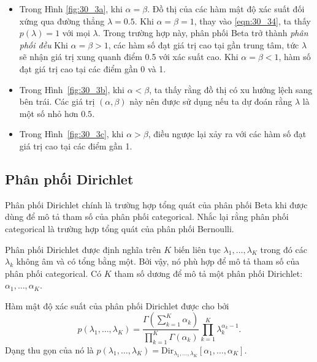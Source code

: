 \begin{itemize}

\item Trong Hình \ref{fig:30_3a}, khi $\alpha =\beta$. Đồ thị của các hàm
mật độ xác suất đối xứng qua đường thẳng $\lambda = 0.5$. Khi $\alpha =
\beta = 1$, thay vào \eqref{eqn:30_34}, ta thấy $p(\lambda) = 1$ với mọi
$\lambda$. Trong trường hợp này, phân phối Beta trở thành \textit{phân phối
đều} Khi $\alpha = \beta > 1$, các hàm số đạt giá trị cao tại gần trung tâm,
tức $\lambda$ sẽ nhận giá trị xung quanh điểm 0.5 với xác suất cao. Khi
$\alpha = \beta < 1$, hàm số đạt giá trị cao tại các điểm gần 0 và 1.    %

\item Trong Hình~\ref{fig:30_3b}, khi $\alpha < \beta$, ta thấy rằng đồ thị
có xu hướng lệch sang bên trái. Các giá trị $(\alpha, \beta)$ này nên được
sử dụng nếu ta dự đoán rằng $\lambda$ là một số nhỏ hơn $0.5$.

\item Trong Hình~\ref{fig:30_3c}, khi $\alpha > \beta$, điều ngược lại xảy
ra với các hàm số đạt giá trị cao tại các điểm gần 1.
\end{itemize}


\subsection{Phân phối Dirichlet}

Phân phối Dirichlet chính là trường hợp tổng quát của phân phối Beta khi được
dùng để mô tả tham số của phân phối categorical. Nhắc lại rằng phân phối
categorical là trường hợp tổng quát của phân phối Bernoulli.

Phân phối Dirichlet được định nghĩa trên $K$ biến liên tục $\lambda_1, \dots,
\lambda_K$ trong đó các $\lambda_k$ không âm và có tổng bằng một. Bởi vậy, nó
phù hợp để mô tả tham số của phân phối categorical.
Có $K$ tham số {dương} để mô tả một phân phối Dirichlet:
$\alpha_1, \dots, \alpha_K$.

Hàm mật độ xác suất của phân phối Dirichlet được cho bởi
\begin{equation}
\label{eqn:30_35}
p(\lambda_1, \dots, \lambda_K) = \frac{\Gamma(\sum_{k=1}^K \alpha_k)}{\prod_{k=1}^K\Gamma(\alpha_k)} \prod_{k=1}^K \lambda_k^{\alpha_k - 1}.
\end{equation}
Dạng thu gọn của nó là
$p(\lambda_1, \dots, \lambda_K) = \text{Dir}_{\lambda_1, \dots, \lambda_K}[\alpha_1, \dots, \alpha_K]$.


